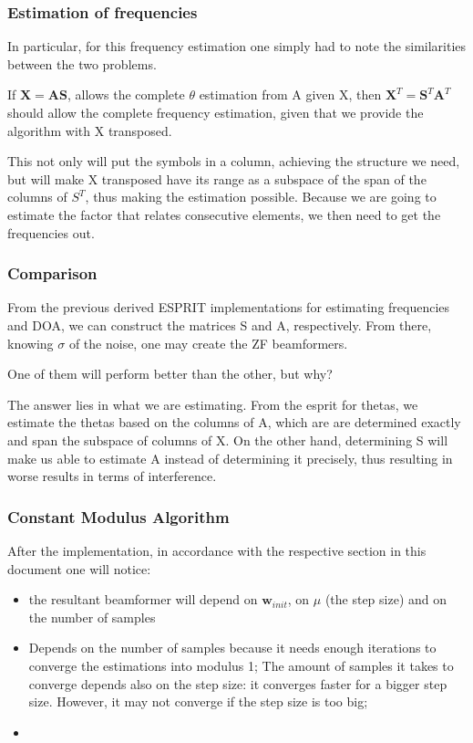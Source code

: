 \documentclass[12pt, a4paper]{article}
\begin{document}
\subsubsection{Estimation of frequencies}
In particular, for this frequency estimation one simply had to note the similarities between the two problems.

If $\mathbf{X} = \mathbf{AS}$, allows the complete $\theta$ estimation from A given X, then $\mathbf{X}^T = \mathbf{S}^T\mathbf{A}^T$ should allow the complete frequency estimation, given that we provide the algorithm with X transposed.

This not only will put the symbols in a column, achieving the structure we need, but will make X transposed have its range as a subspace of the span of the columns of $S^T$, thus making the estimation possible. Because we are going to estimate the factor that relates consecutive elements, we then need to get the frequencies out.


\subsubsection{Comparison}
From the previous derived ESPRIT implementations for estimating frequencies and DOA, we can construct the matrices S and A, respectively.
From there, knowing $\sigma$ of the noise, one may create the ZF beamformers.

One of them will perform better than the other, but why?

The answer lies in what we are estimating. From the esprit for thetas, we estimate the thetas based on the columns of A, which are are determined exactly and span the subspace of columns of X. On the other hand, determining S will make us able to estimate A instead of determining it precisely, thus resulting in worse results in terms of interference.


\subsubsection{Constant Modulus Algorithm}
After the implementation, in accordance with the respective section in this document one will notice:
\begin{itemize}
    \item the resultant beamformer will depend on $\mathbf{w}_{init}$, on $\mu$ (the step size) and on the number of samples
    \item Depends on the number of samples because it needs enough iterations to converge the estimations into modulus 1; The amount of samples it takes to converge depends also on the step size: it converges faster for a bigger step size. However, it may not converge if the step size is too big;
    \item 
\end{itemize}
\end{document}
